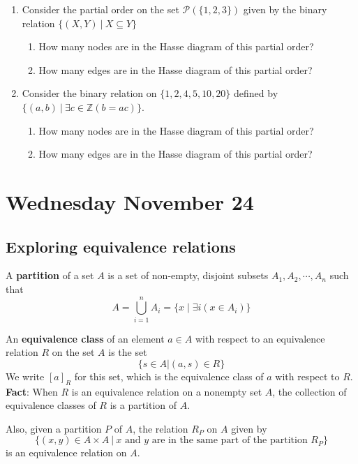 \documentclass[12pt, oneside]{article}
\begin{document}
\begin{enumerate}
\begin{enumerate}
\item Consider the partial order on the set $\mathcal{P}(\{1,2,3\})$ given by the binary relation 
    $\{ (X,Y) ~|~X \subseteq Y \}$
    \begin{enumerate}
    \item How many nodes are in the Hasse diagram of this partial order?
    \item How many edges are in the Hasse diagram of this partial order?
    \end{enumerate}
\item Consider the binary relation on $\{1,2,4,5,10,20\}$ 
defined by $\{(a,b) ~|~ \exists c \in \mathbb{Z} ( b = ac)\}$.
    \begin{enumerate}
    \item How many nodes are in the Hasse diagram of this partial order?
    \item How many edges are in the Hasse diagram of this partial order?
    \end{enumerate}
\end{enumerate} \end{enumerate}
\newpage

\section*{Wednesday November 24}
\subsection*{Exploring equivalence relations}


A {\bf partition} of a set $A$ is a set of non-empty, disjoint subsets 
$A_1, A_2, \cdots, A_n$ such that 
\[
    A = \bigcup_{i=1}^{n} A_i = \{ x \mid \exists i (x \in A_i) \}
\] 

An {\bf equivalence class} of an element $a \in A$ 
with respect to an equivalence relation $R$ on the set $A$ is the set 
\[
    \{s \in A | (a, s) \in R \}
\] 
We write $[a]_R$ for this set, which is the equivalence class of $a$ with respect to $R$. 
{\bf Fact}: When $R$ is an equivalence relation on a nonempty set $A$, 
the collection of equivalence classes of $R$ is a partition of $A$.

Also, given a partition $P$ of $A$, the relation $R_P$ on $A$ given by 
\[
    \{ (x,y) \in A \times A ~|~ \text{$x$ and $y$ are in the same part of the partition $R_P$}\}
\]
is an equivalence relation on $A$. 
\end{document}
